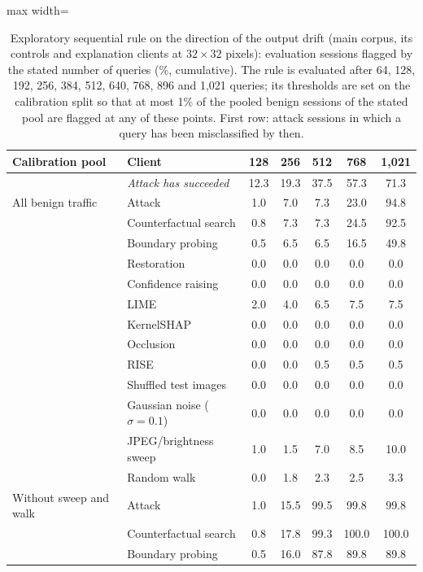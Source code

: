 \begin{table}[!tbp]
\centering\footnotesize\setlength{\tabcolsep}{4pt}
\caption{Exploratory sequential rule on the direction of the output drift (main corpus, its controls and explanation clients at $32\times32$ pixels): evaluation sessions flagged by the stated number of queries (\%, cumulative). The rule is evaluated after 64, 128, 192, 256, 384, 512, 640, 768, 896 and 1{,}021 queries; its thresholds are set on the calibration split so that at most 1\% of the pooled benign sessions of the stated pool are flagged at any of these points. First row: attack sessions in which a query has been misclassified by then.}
\label{tab:decision}
\vspace{3pt}
\begin{adjustbox}{max width=\textwidth}
\begin{tabular}{llccccc}
\toprule
Calibration pool & Client & 128 & 256 & 512 & 768 & 1{,}021 \\
\midrule
 & \emph{Attack has succeeded} & 12.3 & 19.3 & 37.5 & 57.3 & 71.3 \\
All benign traffic & Attack & 1.0 & 7.0 & 7.3 & 23.0 & 94.8 \\
 & Counterfactual search & 0.8 & 7.3 & 7.3 & 24.5 & 92.5 \\
 & Boundary probing & 0.5 & 6.5 & 6.5 & 16.5 & 49.8 \\
 & Restoration & 0.0 & 0.0 & 0.0 & 0.0 & 0.0 \\
 & Confidence raising & 0.0 & 0.0 & 0.0 & 0.0 & 0.0 \\
 & LIME & 2.0 & 4.0 & 6.5 & 7.5 & 7.5 \\
 & KernelSHAP & 0.0 & 0.0 & 0.0 & 0.0 & 0.0 \\
 & Occlusion & 0.0 & 0.0 & 0.0 & 0.0 & 0.0 \\
 & RISE & 0.0 & 0.0 & 0.5 & 0.5 & 0.5 \\
 & Shuffled test images & 0.0 & 0.0 & 0.0 & 0.0 & 0.0 \\
 & Gaussian noise ($\sigma=0.1$) & 0.0 & 0.0 & 0.0 & 0.0 & 0.0 \\
 & JPEG/brightness sweep & 1.0 & 1.5 & 7.0 & 8.5 & 10.0 \\
 & Random walk & 0.0 & 1.8 & 2.3 & 2.5 & 3.3 \\[2pt]
Without sweep and walk & Attack & 1.0 & 15.5 & 99.5 & 99.8 & 99.8 \\
 & Counterfactual search & 0.8 & 17.8 & 99.3 & 100.0 & 100.0 \\
 & Boundary probing & 0.5 & 16.0 & 87.8 & 89.8 & 89.8 \\

\end{tabular}
\end{adjustbox}
\end{table}
